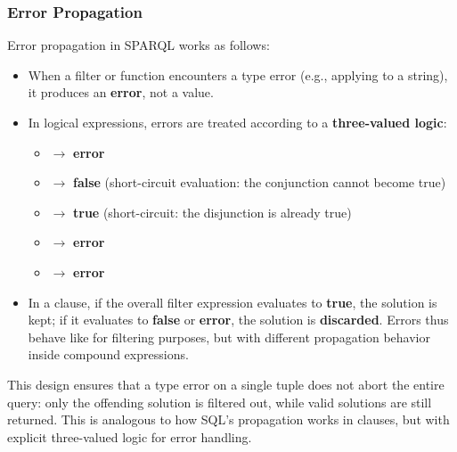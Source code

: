 \subsubsection{Error Propagation}
Error propagation in SPARQL works as follows:
\begin{itemize}
    \item When a filter or function encounters a type error (e.g., applying  to a string), it produces an \textbf{error}, not a value.
    \item In logical expressions, errors are treated according to a \textbf{three-valued logic}:
    \begin{itemize}
        \item {} \(\to\) \textbf{error}
        \item {} \(\to\) \textbf{false} (short-circuit evaluation: the conjunction cannot become true)
        \item {} \(\to\) \textbf{true} (short-circuit: the disjunction is already true)
        \item {} \(\to\) \textbf{error}
        \item {} \(\to\) \textbf{error}
    \end{itemize}
    \item In a  clause, if the overall filter expression evaluates to \textbf{true}, the solution is kept; if it evaluates to \textbf{false} or \textbf{error}, the solution is \textbf{discarded}. Errors thus behave like  for filtering purposes, but with different propagation behavior inside compound expressions.
\end{itemize}

This design ensures that a type error on a single tuple does not abort the entire query: only the offending solution is filtered out, while valid solutions are still returned. 
This is analogous to how SQL's  propagation works in  clauses, but with explicit three-valued logic for error handling.

